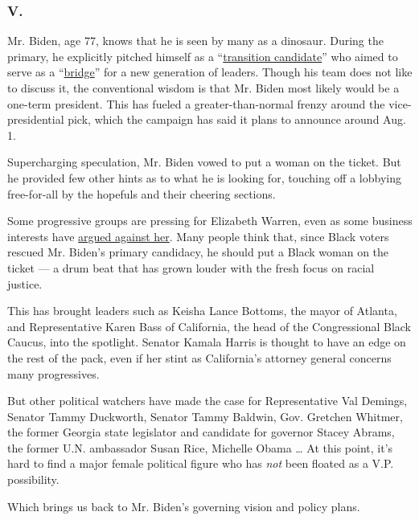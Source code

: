 \hypertarget{v}{%
\subsubsection{V.}\label{v}}

Mr. Biden, age 77, knows that he is seen by many as a dinosaur. During
the primary, he explicitly pitched himself as a
``\href{https://www.nytimes.com/2020/05/03/us/politics/joe-biden-vice-president-pick.html}{transition
candidate}'' who aimed to serve as a
``\href{https://www.cnn.com/2020/03/09/politics/joe-biden-bridge-new-generation-of-leaders/index.html}{bridge}''
for a new generation of leaders. Though his team does not like to
discuss it, the conventional wisdom is that Mr. Biden most likely would
be a one-term president. This has fueled a greater-than-normal frenzy
around the vice-presidential pick, which the campaign has said it plans
to announce around Aug. 1.

Supercharging speculation, Mr. Biden vowed to put a woman on the ticket.
But he provided few other hints as to what he is looking for, touching
off a lobbying free-for-all by the hopefuls and their cheering sections.

Some progressive groups are pressing for Elizabeth Warren, even as some
business interests have
\href{https://www.cnbc.com/2020/04/30/donors-pressure-joe-biden-to-not-pick-elizabeth-warren-as-vp.html}{argued
against her}. Many people think that, since Black voters rescued Mr.
Biden's primary candidacy, he should put a Black woman on the ticket ---
a drum beat that has grown louder with the fresh focus on racial
justice.

This has brought leaders such as Keisha Lance Bottoms, the mayor of
Atlanta, and Representative Karen Bass of California, the head of the
Congressional Black Caucus, into the spotlight. Senator Kamala Harris is
thought to have an edge on the rest of the pack, even if her stint as
California's attorney general concerns many progressives.

But other political watchers have made the case for Representative Val
Demings, Senator Tammy Duckworth, Senator Tammy Baldwin, Gov. Gretchen
Whitmer, the former Georgia state legislator and candidate for governor
Stacey Abrams, the former U.N. ambassador Susan Rice, Michelle Obama
\ldots{} At this point, it's hard to find a major female political
figure who has \emph{not} been floated as a V.P. possibility.

Which brings us back to Mr. Biden's governing vision and policy plans.


